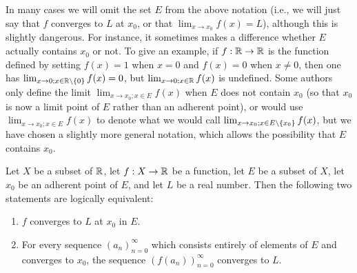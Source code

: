 \begin{rmk}\label{i:9.3.7}
  In many cases we will omit the set \(E\) from the above notation (i.e., we will just say that \(f\) converges to \(L\) at \(x_0\), or that \(\lim_{x \to x_0} f(x) = L\)), although this is slightly dangerous.
  For instance, it sometimes makes a difference whether \(E\) actually contains \(x_0\) or not.
  To give an example, if \(f : \mathbb{R} \to \mathbb{R}\) is the function defined by setting \(f(x) = 1\) when \(x = 0\) and \(f(x) = 0\) when \(x \neq 0\), then one has \(\lim_{x \to 0 ; x \in \mathbb{R} \setminus \left\lbrace0\right\rbrace} f(x) = 0\), but \(\lim_{x \to 0 ; x \in \mathbb{R}} f(x)\) is undefined.
  Some authors only define the limit \(\lim_{x \to x_0 ; x \in E} f(x)\) when \(E\) does not contain \(x_0\) (so that \(x_0\) is now a limit point of \(E\) rather than an adherent point), or would use \(\lim_{x \to x_0 ; x \in E} f(x)\) to denote what we would call \(\lim_{x \to x_0 ; x \in E \setminus \left\lbrace x_0\right\rbrace} f(x)\), but we have chosen a slightly more general notation, which allows the possibility that \(E\) contains \(x_0\).
\end{rmk}

\setcounter{thm}{8}
\begin{prop}\label{i:9.3.9}
  Let \(X\) be a subset of \(\mathbb{R}\), let \(f : X \to \mathbb{R}\) be a function, let \(E\) be a subset of \(X\), let \(x_0\) be an adherent point of \(E\), and let \(L\) be a real number.
  Then the following two statements are logically equivalent:
  \begin{enumerate}
    \item \(f\) converges to \(L\) at \(x_0\) in \(E\).
    \item For every sequence \((a_n)_{n = 0}^\infty\) which consists entirely of elements of \(E\) and converges to \(x_0\), the sequence \((f(a_n))_{n = 0}^\infty\) converges to \(L\).
  \end{enumerate}
\end{prop}

